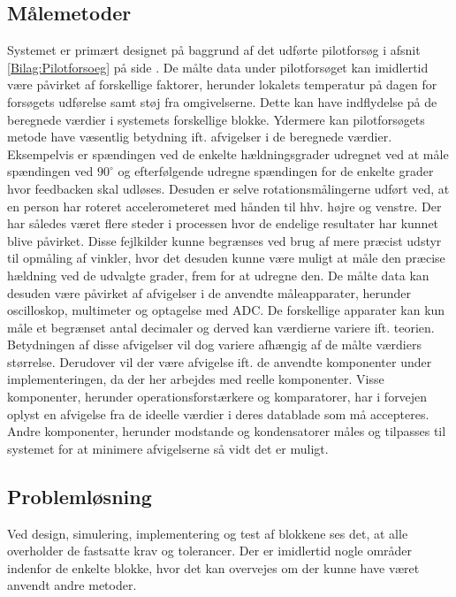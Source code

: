 \subsection{Målemetoder}
Systemet er primært designet på baggrund af det udførte pilotforsøg i afsnit \ref{Bilag:Pilotforsoeg} på side \pageref{Bilag:Pilotforsoeg}. De målte data under pilotforsøget kan imidlertid være påvirket af forskellige faktorer, herunder lokalets temperatur på dagen for forsøgets udførelse samt støj fra omgivelserne. Dette kan have indflydelse på de beregnede værdier i systemets forskellige blokke.
Ydermere kan pilotforsøgets metode have væsentlig betydning ift. afvigelser i de beregnede værdier. Eksempelvis er spændingen ved de enkelte hældningsgrader udregnet ved at måle spændingen ved $90^{\circ}$ og efterfølgende udregne spændingen for de enkelte grader hvor feedbacken skal udløses. Desuden er selve rotationsmålingerne udført ved, at en person har roteret accelerometeret med hånden til hhv. højre og venstre. Der har således været flere steder i processen hvor de endelige resultater har kunnet blive påvirket. Disse fejlkilder kunne begrænses ved brug af mere præcist udstyr til opmåling af vinkler, hvor det desuden kunne være muligt at måle den præcise hældning ved de udvalgte grader, frem for at udregne den.  
De målte data kan desuden være påvirket af afvigelser i de anvendte måleapparater, herunder oscilloskop, multimeter og optagelse med ADC. De forskellige apparater kan kun måle et begrænset antal decimaler og derved kan værdierne variere ift. teorien. Betydningen af disse afvigelser vil dog variere afhængig af de målte værdiers størrelse. Derudover vil der være afvigelse ift. de anvendte komponenter under implementeringen, da der her arbejdes med reelle komponenter. Visse komponenter, herunder operationsforstærkere og komparatorer, har i forvejen oplyst en afvigelse fra de ideelle værdier i deres datablade som må accepteres. Andre komponenter, herunder modstande og kondensatorer måles og tilpasses til systemet for at minimere afvigelserne så vidt det er muligt. 

\subsection{Problemløsning}
Ved design, simulering, implementering og test af blokkene ses det, at alle overholder de fastsatte krav og tolerancer. Der er imidlertid nogle områder indenfor de enkelte blokke, hvor det kan overvejes om der kunne have været anvendt andre metoder.
